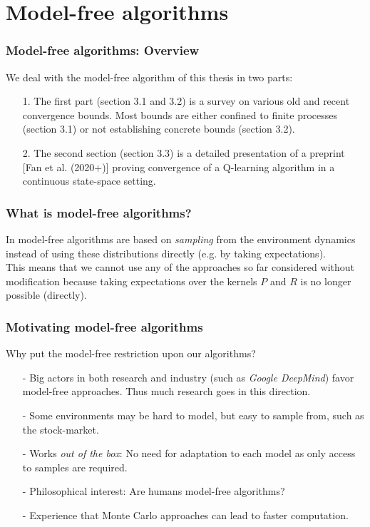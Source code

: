 \documentclass{beamer}[10]
\begin{document}
\section{Model-free algorithms}

\begin{frame}
  \frametitle{Model-free algorithms: Overview}
  We deal with the model-free algorithm of this thesis in two parts:
  \begin{itemize}
    \item[1.] The first part (section 3.1 and 3.2) is a survey
      on various old and recent convergence bounds. Most bounds
      are either confined to finite processes (section 3.1) or
      not establishing concrete bounds (section 3.2).
    \item[2.] The second section (section 3.3) is a detailed
      presentation of a preprint [Fan et al. (2020+)] proving convergence
      of a Q-learning algorithm in a continuous state-space setting.
  \end{itemize} 
\end{frame}

\begin{frame}
  \frametitle{What is model-free algorithms?}
  In model-free algorithms are based on \emph{sampling} from the environment
  dynamics instead of using these distributions directly (e.g. by taking
  expectations).
  \\ This means that we cannot use any of the approaches so far
  considered without modification because
  taking expectations over the kernels $P$ and $R$ is no longer possible
  (directly).
\end{frame}

\begin{frame}
  \frametitle{Motivating model-free algorithms}
  \begingroup
  \footnotesize
  Why put the model-free restriction upon our algorithms?
  \begin{itemize}
    \item[-] Big actors in both research and industry (such as
      \emph{Google DeepMind}) favor model-free approaches.
      Thus much research goes in this direction.
    \item[-] Some environments may be hard to model, but easy to sample from,
      such as the stock-market.
    \item[-] Works \emph{out of the box}: No need for adaptation to each model as
      only access to samples are required.
    \item[-] Philosophical interest: Are humans model-free algorithms?
    \item[-] Experience that Monte Carlo approaches can lead to faster computation.
  \end{itemize}
  \endgroup
\end{frame}
\end{document}
